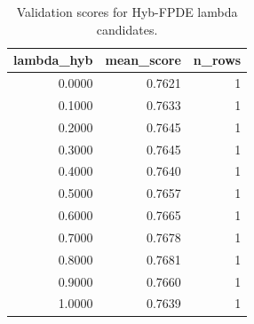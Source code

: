 \begin{table}[t]
\caption{Validation scores for Hyb-FPDE lambda candidates.}
\label{tab:lambda_distribution_computed}
\centering
\begin{tabular}{rrr}
\toprule
lambda\_hyb & mean\_score & n\_rows \\
\midrule
0.0000 & 0.7621 & 1 \\
0.1000 & 0.7633 & 1 \\
0.2000 & 0.7645 & 1 \\
0.3000 & 0.7645 & 1 \\
0.4000 & 0.7640 & 1 \\
0.5000 & 0.7657 & 1 \\
0.6000 & 0.7665 & 1 \\
0.7000 & 0.7678 & 1 \\
0.8000 & 0.7681 & 1 \\
0.9000 & 0.7660 & 1 \\
1.0000 & 0.7639 & 1 \\
\bottomrule
\end{tabular}

\end{table}
